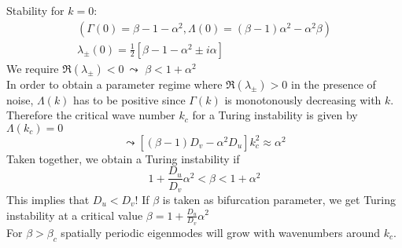 Stability for $k=0$:
\begin{align*}
	\left(\Gamma(0)=\beta-1-\alpha^2,\Lambda(0)=(\beta-1)\alpha^2-\alpha^2\beta\right)\\
	\lambda_\pm(0)=\frac{1}{2}\left[\beta-1-\alpha^2\pm i\alpha\right]
\end{align*}
We require $\Re(\lambda_\pm)<0 \ \leadsto$ \underline{\underline{$\beta < 1+\alpha^2$}}\\
In order to obtain a parameter regime where $\Re(\lambda_\pm)>0$ in the presence of noise, $\Lambda(k)$ has to be positive since $\Gamma(k)$ is monotonously decreasing with $k$. Therefore the critical wave number $k_c$ for a Turing instability is given by $\Lambda(k_c)=0$
\begin{equation*}
	\leadsto\left[(\beta-1)D_v-\alpha^2D_u\right]k_c^2\approx\alpha^2
\end{equation*}
Taken together, we obtain a Turing instability if
\begin{equation*}
	1+\frac{D_u}{D_v}\alpha^2 < \beta < 1+\alpha^2
\end{equation*}
This implies that $D_u<D_v$!
If $\beta$ is taken as bifurcation parameter, we get Turing instability at a critical value $\beta=1+\frac{D_u}{D_v}\alpha^2$\\
For $\beta > \beta_c$ spatially periodic eigenmodes will grow with wavenumbers around $k_c$.
